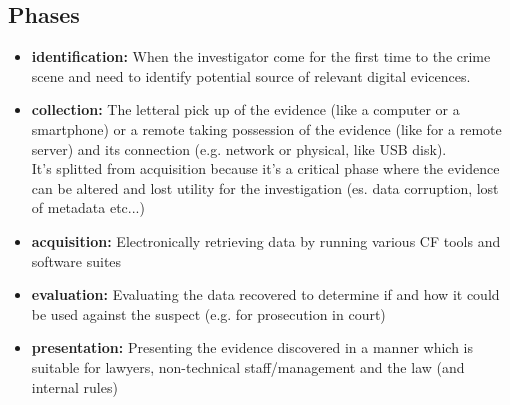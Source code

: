 \subsection{Phases}

\begin{itemize}[itemsep=0pt]
    \item \textbf{identification:} When the investigator come for the first time to the crime scene and need to identify potential source of relevant digital evicences. 
    
    \item \textbf{collection:} The letteral pick up of the evidence (like a computer or a smartphone) or a remote taking possession of the evidence (like for a remote server) and its connection (e.g. network or physical, like USB disk). \\ It's splitted from acquisition because it's a critical phase where the evidence can be altered and lost utility for the investigation (es. data corruption, lost of metadata etc...)
    
    \item \textbf{acquisition:} Electronically retrieving data by running various CF tools and software suites
    
    \item \textbf{evaluation:} Evaluating the data recovered to determine if and how it could be used against the suspect (e.g. for prosecution in court)
    
    \item \textbf{presentation:} Presenting the evidence discovered in a manner which is suitable for lawyers, non-technical staff/management and the law (and internal rules)
\end{itemize}

